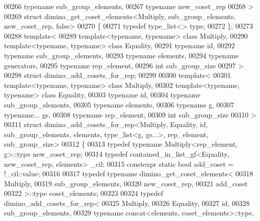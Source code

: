 \begin{DoxyCode}
00266   \textcolor{keyword}{typename} sub\_group\_elements,
00267   \textcolor{keyword}{typename} new\_coset\_rep
00268 >
00269 \textcolor{keyword}{struct }dimino\_get\_coset\_elements<Multiply, sub\_group\_elements, new\_coset\_rep, false>
00270 \{
00271   \textcolor{keyword}{typedef} type\_list<> type;
00272 \};
00273 
00288 \textcolor{keyword}{template}<
00289   \textcolor{keyword}{template}<\textcolor{keyword}{typename}, \textcolor{keyword}{typename}> \textcolor{keyword}{class }Multiply,
00290   \textcolor{keyword}{template}<\textcolor{keyword}{typename}, \textcolor{keyword}{typename}> \textcolor{keyword}{class }Equality,
00291   \textcolor{keyword}{typename} id,
00292   \textcolor{keyword}{typename} sub\_group\_elements,
00293   \textcolor{keyword}{typename} elements,
00294   \textcolor{keyword}{typename} generators,
00295   \textcolor{keyword}{typename} rep\_element,
00296   \textcolor{keywordtype}{int} sub\_group\_size
00297 >
00298 \textcolor{keyword}{struct }dimino\_add\_cosets\_for\_rep;
00299 
00300 \textcolor{keyword}{template}<
00301   \textcolor{keyword}{template}<\textcolor{keyword}{typename}, \textcolor{keyword}{typename}> \textcolor{keyword}{class }Multiply,
00302   \textcolor{keyword}{template}<\textcolor{keyword}{typename}, \textcolor{keyword}{typename}> \textcolor{keyword}{class }Equality,
00303   \textcolor{keyword}{typename} id,
00304   \textcolor{keyword}{typename} sub\_group\_elements,
00305   \textcolor{keyword}{typename} elements,
00306   \textcolor{keyword}{typename} g,
00307   \textcolor{keyword}{typename}... gs,
00308   \textcolor{keyword}{typename} rep\_element,
00309   \textcolor{keywordtype}{int} sub\_group\_size
00310 >
00311 \textcolor{keyword}{struct }dimino\_add\_cosets\_for\_rep<Multiply, Equality, id, sub\_group\_elements, elements, type\_list<g, gs...>,
       rep\_element, sub\_group\_size>
00312 \{
00313   \textcolor{keyword}{typedef} \textcolor{keyword}{typename} Multiply<rep\_element, g>::type new\_coset\_rep;
00314   \textcolor{keyword}{typedef} contained\_in\_list\_gf<Equality, new\_coset\_rep, elements> \_cil;
00315   constexpr \textcolor{keyword}{static} \textcolor{keywordtype}{bool} add\_coset = !\_cil::value;
00316 
00317   \textcolor{keyword}{typedef} \textcolor{keyword}{typename} dimino\_get\_coset\_elements<
00318     Multiply,
00319     sub\_group\_elements,
00320     new\_coset\_rep,
00321     add\_coset
00322   >::type coset\_elements;
00323 
00324   \textcolor{keyword}{typedef} dimino\_add\_cosets\_for\_rep<
00325     Multiply,
00326     Equality,
00327     id,
00328     sub\_group\_elements,
00329     \textcolor{keyword}{typename} concat<elements, coset\_elements>::type,

\end{DoxyCode}
